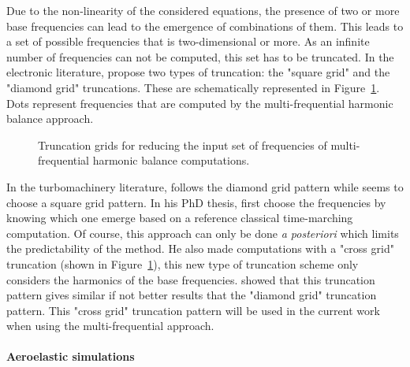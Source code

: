 Due to the non-linearity of the considered
equations, the presence 
of two or more base frequencies can lead to
the emergence of combinations of them.
This leads to a set of possible frequencies that 
is two-dimensional or more. As an infinite number of frequencies
can not be computed, this set 
has to be truncated. In the electronic literature,
\citet{Kundert1988} propose two types of truncation:
the "square grid" and the "diamond grid" truncations.
These are schematically represented in Figure~\ref{fig:dream_hb_truncation}.
Dots represent frequencies that are computed by the multi-frequential
harmonic balance approach.
\begin{figure}[htp]
  \centering
  \caption{Truncation grids for reducing the input set of frequencies of multi-frequential
  harmonic balance computations.}
  \label{fig:dream_hb_truncation}
\end{figure}
In the turbomachinery literature, \citet{Gopinath2007} follows the
diamond grid pattern while \citet{Ekici2007} seems to choose a
square grid pattern. In his PhD thesis, \citet{ThesisGuedeney}
first choose the frequencies by knowing which one emerge based on
a reference classical time-marching computation. Of course,
this approach can only be done \emph{a posteriori} which limits
the predictability of the method. He
also made computations with a "cross grid" truncation 
(shown in Figure~\ref{fig:dream_hb_truncation}), this new type 
of truncation scheme only considers the harmonics of the
base frequencies. \citet{ThesisGuedeney} showed that this
truncation pattern gives
similar if not better results that the
"diamond grid" truncation pattern.  This "cross grid"
truncation pattern will be used in the current work
when using the multi-frequential approach.

\paragraph{Aeroelastic simulations}

